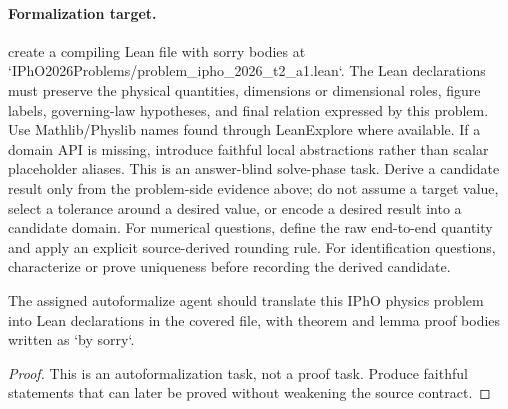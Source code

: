 \paragraph{Formalization target.}
create a compiling Lean file with sorry bodies at `IPhO2026Problems/problem\_ipho\_2026\_t2\_a1.lean`.
The Lean declarations must preserve the physical quantities, dimensions or dimensional roles, figure labels, governing-law hypotheses, and final relation expressed by this problem.
Use Mathlib/Physlib names found through LeanExplore where available. If a domain API is missing, introduce faithful local abstractions rather than scalar placeholder aliases.
This is an answer-blind solve-phase task. Derive a candidate result only from the problem-side evidence above; do not assume a target value, select a tolerance around a desired value, or encode a desired result into a candidate domain.
For numerical questions, define the raw end-to-end quantity and apply an explicit source-derived rounding rule. For identification questions, characterize or prove uniqueness before recording the derived candidate.

\begin{theorem}
\label{thm:physics:ipho_2026_t2_a1:target}
The assigned autoformalize agent should translate this IPhO physics problem into Lean declarations in the covered file, with theorem and lemma proof bodies written as `by sorry`.
\end{theorem}
\begin{proof}
This is an autoformalization task, not a proof task. Produce faithful statements that can later be proved without weakening the source contract.
\end{proof}
